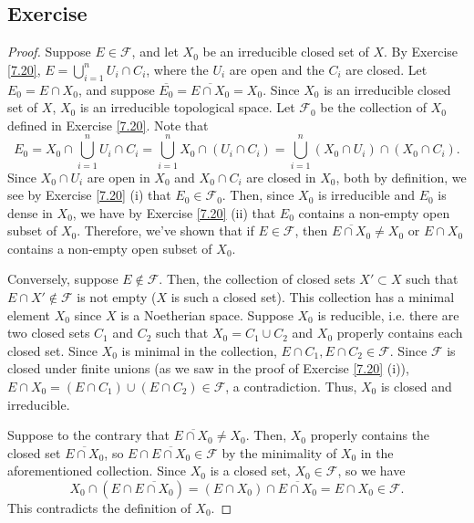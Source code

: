 \subsection{Exercise}\label{7.21}

\begin{proof}
Suppose $E \in \mathcal{F}$, and let $X_0$ be an irreducible closed set of $X$. By Exercise \ref{7.20}, $E = \bigcup_{i=1}^n U_i \cap C_i$, where the $U_i$ are open and
the $C_i$ are closed. Let $E_0 = E \cap X_0$, and suppose $\overline{E_0} = \overline{E \cap X_0} = X_0$. Since $X_0$ is an irreducible closed set of $X$, $X_0$ is an
irreducible topological space. Let $\mathcal{F}_0$ be the collection of $X_0$ defined in Exercise \ref{7.20}. Note that 
$$E_0 = X_0 \cap \bigcup_{i=1}^n U_i \cap C_i = \bigcup_{i=1}^n X_0 \cap (U_i \cap C_i) = \bigcup_{i=1}^n (X_0 \cap U_i) \cap (X_0 \cap C_i).$$
Since $X_0 \cap U_i$ are open in $X_0$ and $X_0 \cap C_i$ are closed in $X_0$, both by definition, we see by Exercise \ref{7.20} (i) that $E_0 \in \mathcal{F}_0$. Then,
since $X_0$ is irreducible and $E_0$ is dense in $X_0$, we have by Exercise \ref{7.20} (ii) that $E_0$ contains a non-empty open subset of $X_0$. Therefore, we've shown
that if $E \in \mathcal{F}$, then $\overline{E \cap X_0} \neq X_0$ or $E \cap X_0$ contains a non-empty open subset of $X_0$.

Conversely, suppose $E \not\in \mathcal{F}$. Then, the collection of closed sets $X' \subset X$ such that $E \cap X' \not\in \mathcal{F}$ is not empty ($X$ is such a closed set). 
This collection has a minimal element $X_0$ since $X$ is a Noetherian space. Suppose $X_0$ is reducible, i.e. there are two closed sets $C_1$ and $C_2$ such that $X_0 = C_1 \cup C_2$
and $X_0$ properly contains each closed set. Since $X_0$ is minimal in the collection, $E\cap C_1, E\cap C_2 \in \mathcal{F}$. Since $\mathcal{F}$ is closed under finite unions (as we 
saw in the proof of Exercise \ref{7.20} (i)), $E \cap X_0 = (E \cap C_1) \cup (E \cap C_2) \in \mathcal{F}$, a contradiction. Thus, $X_0$ is closed and irreducible.

Suppose to the contrary that $\overline{E \cap X_0} \neq X_0$. Then, $X_0$ properly contains the closed set $\overline{E \cap X_0}$, so $E \cap \overline{E \cap X_0} \in \mathcal{F}$
by the minimality of $X_0$ in the aforementioned collection. Since $X_0$ is a closed set, $X_0 \in \mathcal{F}$, so we have 
$$X_0 \cap (E \cap \overline{E \cap X_0}) = (E \cap X_0) \cap \overline{E \cap X_0} = E \cap X_0 \in \mathcal{F}.$$
This contradicts the definition of $X_0$.


\end{proof}
